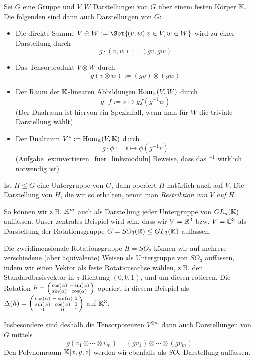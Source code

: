 \begin{lemmadef}
Sei $G$ eine Gruppe und $V,W$ Darstellungen von $G$ über einem festen Körper $\mathbb{K}$. Die folgenden sind dann auch Darstellungen von $G$:
\begin{itemize}
\item Die direkte Summe $V\oplus W := \Set{(v,w) | v\in V, w\in W}$ wird zu einer Darstellung durch
\[g\cdot(v,w) := (gv,gw)\]
\item Das Tensorprodukt $V\otimes W$ durch
\[g(v\otimes w) := (gv)\otimes (gw)\]
\item Der Raum der $\mathbb{K}$-linearen Abbildungen $\operatorname{Hom}_{\mathbb{K}}(V,W)$ durch
\[g\cdot f := v\mapsto gf(g^{-1} w)\]
(Der Dualraum ist hiervon ein Spezialfall, wenn man für $W$ die triviale Darstellung wählt)
\item Der Dualraum $V^\ast:= \operatorname{Hom}_{\mathbb{K}}(V,\mathbb{K})$ durch
\[g\cdot \phi := v\mapsto \phi(g^{-1} v)\]
(Aufgabe \ref{ex:invertieren_fuer_linksmoduln} Beweise, dass das $^{-1}$ wirklich notwendig ist)
\end{itemize}
Ist $H\leq G$ eine Untergruppe von $G$, dann operiert $H$ natürlich auch auf $V$. Die Darstellung von $H$, die wir so erhalten, nennt man \emph{Restriktion von $V$ auf $H$}.
\end{lemmadef}

\begin{example}
So können wir z.B. $\mathbb{K}^m$ auch als Darstellung jeder Untergruppe von $GL_n(\mathbb{K})$ auffassen. Unser zentrales Beispiel wird sein, dass wir $V=\mathbb{R}^3$ bzw. $V=\mathbb{C}^3$ als Darstellung der Rotationsgruppe $G=SO_3(\mathbb{R}) \leq GL_3(\mathbb{K})$ auffassen.

Die zweidimensionale Rotationsgruppe $H=SO_2$ können wir auf mehrere verschiedene (aber äquivalente) Weisen als Untergruppe von $SO_3$ auffassen, indem wir einen Vektor als feste Rotationsachse wählen, z.B. den Standardbasisvektor in $z$-Richtung $(0,0,1)$, und um diesen rotieren. Die Rotation $h = \begin{psmallmatrix} \cos(\alpha) & -\sin(\alpha)\\ \sin(\alpha) & \cos(\alpha)\end{psmallmatrix}$ operiert in diesem Beispiel als $\Delta(h) = \begin{psmallmatrix} \cos(\alpha) & -\sin(\alpha) & 0 \\ \sin(\alpha) & \cos(\alpha) & 0 \\ 0&0&1\end{psmallmatrix}$ auf $\mathbb{K}^3$.

\medbreak
Insbesondere sind deshalb die Tensorpotenzen $V^{\otimes m}$ dann auch Darstellungen von $G$ mittels
\[g(v_1\otimes \cdots\otimes v_m) = (gv_1)\otimes\cdots\otimes(gv_m)\]
Den Polynomraum $\mathbb{K}[x,y,z]$ werden wir ebenfalls als $SO_2$-Darstellung auffassen.
\end{example}

